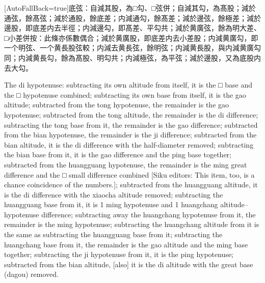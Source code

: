 \documentclass[11pt]{article}
\newcommand{\zhsmall}{\footnotesize\color{black!70}}
\newcommand{\unitlabel}[1]{\marginpar{\raggedleft\tiny\color{gray}#1}}
\newenvironment{unitzh}{\par\CJKfontspec{Noto Serif CJK SC}[AutoFallBack=true]\large\linespread{1.25}\selectfont}{\par}
\newenvironment{uniten}{\par\small\color{black!85}}{\par\medskip}
\begin{document}
\begin{unitzh}\unitlabel{ceyuan-005.9}底弦：自減其股，為□勾、□弦併；自減其勾，為髙股；減於通弦，餘髙弦；減於通股，餘底差；内減通勾，餘髙差；減於邊弦，餘極差；減於邊股，即底差内去半徑；内減邊勾，即髙差、平勾共；減於黄廣弦，餘為明大差、□小差併{\zhsmall 按：此條亦係數偶合}；減於黄廣股，即底差内去小差股；内減黄廣勾，即一个明弦、一个黄長股弦較；内減去黄長弦，餘明弦；内減黄長股，與内減黄廣勾同；内減黄長勾，餘為髙股、明勾共；内減極弦，為平弦；減於邊股，{\zhsmall 又}為底股内去大勾。\end{unitzh}
\begin{uniten}The di hypotenuse: subtracting its own altitude from itself, it is the □ base and the □ hypotenuse combined; subtracting its own base from itself, it is the gao altitude; subtracted from the tong hypotenuse, the remainder is the gao hypotenuse; subtracted from the tong altitude, the remainder is the di difference; subtracting the tong base from it, the remainder is the gao difference; subtracted from the bian hypotenuse, the remainder is the ji difference; subtracted from the bian altitude, it is the di difference with the half-diameter removed; subtracting the bian base from it, it is the gao difference and the ping base together; subtracted from the huangguang hypotenuse, the remainder is the ming great difference and the □ small difference combined [Siku editors: This item, too, is a chance coincidence of the numbers.]; subtracted from the huangguang altitude, it is the di difference with the xiaocha altitude removed; subtracting the huangguang base from it, it is 1 ming hypotenuse and 1 huangchang altitude–hypotenuse difference; subtracting away the huangchang hypotenuse from it, the remainder is the ming hypotenuse; subtracting the huangchang altitude from it is the same as subtracting the huangguang base from it; subtracting the huangchang base from it, the remainder is the gao altitude and the ming base together; subtracting the ji hypotenuse from it, it is the ping hypotenuse; subtracted from the bian altitude, [also] it is the di altitude with the great base (dagou) removed.\end{uniten}
\end{document}
